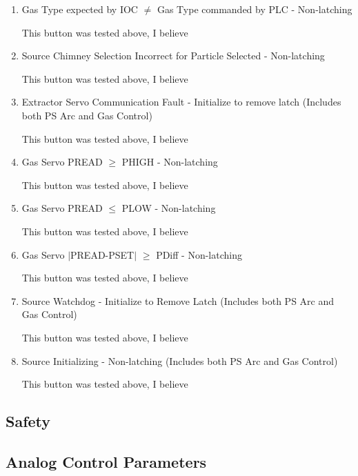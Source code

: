 \documentclass[11pt]{book}		%
\begin{document}
\begin{enumerate}
 \item Gas Type expected by IOC $\neq$ Gas Type commanded by PLC - Non-latching

\color{red}
This button was tested above, I believe
\color{black}

 \item Source Chimney Selection Incorrect for Particle Selected - Non-latching

\color{red}
This button was tested above, I believe
\color{black}

 \item Extractor Servo Communication Fault - Initialize to remove latch (Includes both PS Arc and Gas Control)

\color{red}
This button was tested above, I believe
\color{black}

 \item Gas Servo PREAD $\geq$ PHIGH - Non-latching

\color{red}
This button was tested above, I believe
\color{black}

 \item Gas Servo PREAD $\leq$ PLOW - Non-latching

\color{red}
This button was tested above, I believe
\color{black}

 \item Gas Servo $\mid$PREAD-PSET$\mid$ $\geq$ PDiff - Non-latching

\color{red}
This button was tested above, I believe
\color{black}

 \item Source Watchdog - Initialize to Remove Latch (Includes both PS Arc and Gas Control)

\color{red}
This button was tested above, I believe
\color{black}

 \item Source Initializing - Non-latching (Includes both PS Arc and Gas Control)

\color{red}
This button was tested above, I believe
\color{black}

\end{enumerate}


\subsection{Safety}


\subsection{Analog Control Parameters}
\end{document}

